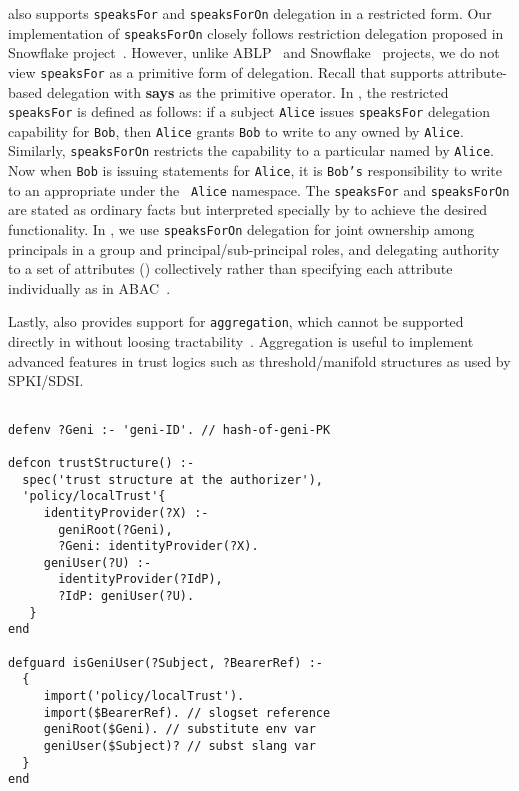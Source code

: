  also supports {\tt speaksFor} and {\tt speaksForOn} delegation
in a restricted form. Our implementation of {\tt speaksForOn} closely follows
restriction delegation proposed in Snowflake
project~\cite{Howell:2000:FSS:867818, Howell:2000}.  However, unlike
ABLP~\cite{abadi93:accesscalculus} and Snowflake~\cite{Howell:2000:FSS:867818}
projects, we do not view {\tt speaksFor} as a primitive form of delegation.
Recall that  supports attribute-based delegation with {\bf says}
as the primitive operator. In , the restricted {\tt speaksFor} is
defined as follows: if a subject {\tt Alice} issues {\tt speaksFor} delegation
capability for {\tt Bob}, then {\tt Alice} grants {\tt Bob} to write to any
 owned by {\tt Alice}. Similarly, {\tt speaksForOn} restricts
the capability to a particular  named by {\tt Alice}. Now when
{\tt Bob} is issuing statements for {\tt Alice}, it is {\tt Bob's}
responsibility to write to an appropriate  under the {\tt
Alice} namespace. The {\tt speaksFor} and {\tt speaksForOn} are stated as
ordinary  facts but interpreted specially by  to
achieve the desired functionality. In , we use {\tt speaksForOn}
delegation for joint ownership among principals in a group and
principal/sub-principal roles, and delegating authority to a set of attributes
() collectively rather than specifying each attribute
individually as in ABAC~\cite{rt-abac}.

Lastly,  also provides support for {\tt aggregation}, which
cannot be supported directly in  without loosing
tractability~\cite{Grohe:2010}.  Aggregation is useful to
implement advanced features in trust logics such as threshold/manifold
structures as used by SPKI/SDSI.






\begin{lstlisting}[float, showstringspaces=false, caption={Project Investigator (PI) relies on local trust policy and bearer reference passed by the {\tt ?Subject} to determine whether {\tt ?Subject} is a valid geni user.}, label=code:pi]

defenv ?Geni :- 'geni-ID'. // hash-of-geni-PK

defcon trustStructure() :-
  spec('trust structure at the authorizer'),
  'policy/localTrust'{
     identityProvider(?X) :- 
       geniRoot(?Geni), 
       ?Geni: identityProvider(?X).
     geniUser(?U) :- 
       identityProvider(?IdP), 
       ?IdP: geniUser(?U).
   }
end

defguard isGeniUser(?Subject, ?BearerRef) :- 
  {
     import('policy/localTrust').
     import($BearerRef). // slogset reference
     geniRoot($Geni). // substitute env var
     geniUser($Subject)? // subst slang var
  }
end
\end{lstlisting}

